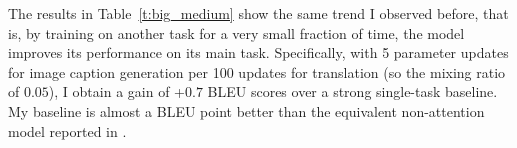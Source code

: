The results in Table~\ref{t:big_medium} show the same trend I observed
before, that is, by training on another task for a very small
fraction of time, the model improves its performance on its main task.
Specifically, with 5 parameter updates for image caption generation per 100
updates for translation (so the mixing ratio of $0.05$), I obtain a 
gain of +$0.7$ BLEU scores over a strong single-task baseline. My baseline is
almost a BLEU point better than the equivalent non-attention model reported in
\cite{luong15attn}.

